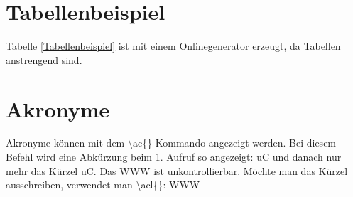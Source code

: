 \section{Tabellenbeispiel}
\label{sec:tabelle}

Tabelle \ref{Tabellenbeispiel} ist mit einem Onlinegenerator erzeugt, da Tabellen anstrengend sind.

\begin{table}[H]
\caption{Tabellenbeispiel}
\label{Tabellenbeispiel}
\end{table}

\section{Akronyme}
\label{sec:akronyme}
Akronyme können mit dem \textbackslash{}ac\{\} Kommando angezeigt werden. Bei diesem Befehl wird eine Abkürzung beim 1. Aufruf so angezeigt: \ac{uC} und danach nur mehr das Kürzel \ac{uC}. Das \ac{WWW} ist unkontrollierbar. Möchte man das Kürzel ausschreiben, verwendet man \textbackslash{}acl\{\}: \acl{WWW}